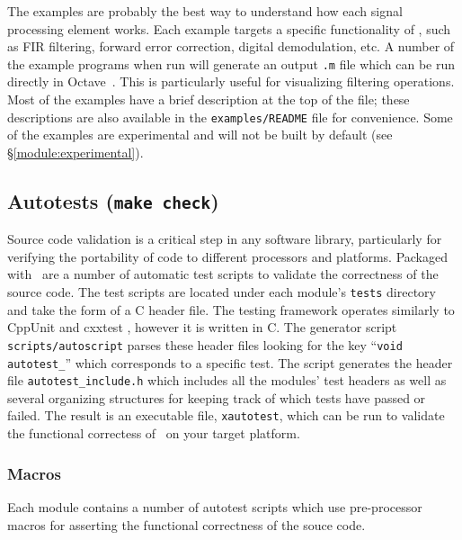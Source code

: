 The examples are probably the best way to understand how each signal
processing element works.
Each example targets a specific functionality of \liquid,
such as FIR filtering, forward error correction, digital demodulation,
etc.
A number of the example programs when run will generate an output
{\tt .m} file which can be run directly in Octave~\cite{octave:web}.
This is particularly useful for visualizing filtering operations.
Most of the examples have a brief description at the top of the file;
these descriptions are also available in the {\tt examples/README} file
for convenience.
Some of the examples are experimental and will not be built by default
(see \S\ref{module:experimental}).

\subsection{Autotests ({\tt make check})}
\label{section:installation:targets:autotests}
Source code validation is a critical step in any software library,
particularly for verifying the portability of code to different processors and
platforms.
Packaged with \liquid\ are a number of automatic test scripts to validate the
correctness of the source code.
The test scripts are located under each module's {\tt tests} directory and
take the form of a C header file.
The testing framework operates similarly to CppUnit \cite{cppunit:web} and
cxxtest \cite{cxxtest:web}, however it is written in C.
The generator script {\tt scripts/autoscript} parses these header files looking for
the key ``{\tt void autotest\_}'' which corresponds to a specific test.
The script generates the header file {\tt autotest\_include.h} which
includes all the modules' test headers as well as several organizing
structures for keeping track of which tests have passed or failed.
The result is an executable file, {\tt xautotest}, which can be run to
validate the functional correctess of \liquid\ on your target platform.

\subsubsection{Macros}
Each module contains a number of autotest scripts which use pre-processor
macros for asserting the functional correctness of the souce code.

